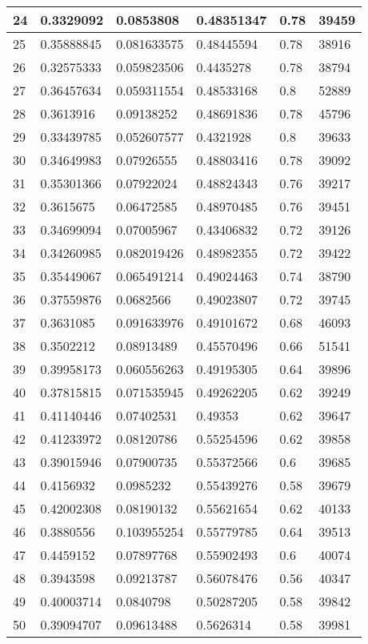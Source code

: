 \begin{longtable}{|l|l|l|l|l|l|}
24 & 0.3329092 & 0.0853808 & 0.48351347 & 0.78 & 39459 \\ \hline 
25 & 0.35888845 & 0.081633575 & 0.48445594 & 0.78 & 38916 \\ \hline 
26 & 0.32575333 & 0.059823506 & 0.4435278 & 0.78 & 38794 \\ \hline 
27 & 0.36457634 & 0.059311554 & 0.48533168 & 0.8 & 52889 \\ \hline 
28 & 0.3613916 & 0.09138252 & 0.48691836 & 0.78 & 45796 \\ \hline 
29 & 0.33439785 & 0.052607577 & 0.4321928 & 0.8 & 39633 \\ \hline 
30 & 0.34649983 & 0.07926555 & 0.48803416 & 0.78 & 39092 \\ \hline 
31 & 0.35301366 & 0.07922024 & 0.48824343 & 0.76 & 39217 \\ \hline 
32 & 0.3615675 & 0.06472585 & 0.48970485 & 0.76 & 39451 \\ \hline 
33 & 0.34699094 & 0.07005967 & 0.43406832 & 0.72 & 39126 \\ \hline 
34 & 0.34260985 & 0.082019426 & 0.48982355 & 0.72 & 39422 \\ \hline 
35 & 0.35449067 & 0.065491214 & 0.49024463 & 0.74 & 38790 \\ \hline 
36 & 0.37559876 & 0.0682566 & 0.49023807 & 0.72 & 39745 \\ \hline 
37 & 0.3631085 & 0.091633976 & 0.49101672 & 0.68 & 46093 \\ \hline 
38 & 0.3502212 & 0.08913489 & 0.45570496 & 0.66 & 51541 \\ \hline 
39 & 0.39958173 & 0.060556263 & 0.49195305 & 0.64 & 39896 \\ \hline 
40 & 0.37815815 & 0.071535945 & 0.49262205 & 0.62 & 39249 \\ \hline 
41 & 0.41140446 & 0.07402531 & 0.49353 & 0.62 & 39647 \\ \hline 
42 & 0.41233972 & 0.08120786 & 0.55254596 & 0.62 & 39858 \\ \hline 
43 & 0.39015946 & 0.07900735 & 0.55372566 & 0.6 & 39685 \\ \hline 
44 & 0.4156932 & 0.0985232 & 0.55439276 & 0.58 & 39679 \\ \hline 
45 & 0.42002308 & 0.08190132 & 0.55621654 & 0.62 & 40133 \\ \hline 
46 & 0.3880556 & 0.103955254 & 0.55779785 & 0.64 & 39513 \\ \hline 
47 & 0.4459152 & 0.07897768 & 0.55902493 & 0.6 & 40074 \\ \hline 
48 & 0.3943598 & 0.09213787 & 0.56078476 & 0.56 & 40347 \\ \hline 
49 & 0.40003714 & 0.0840798 & 0.50287205 & 0.58 & 39842 \\ \hline 
50 & 0.39094707 & 0.09613488 & 0.5626314 & 0.58 & 39981 \\ \hline 
\end{longtable}
